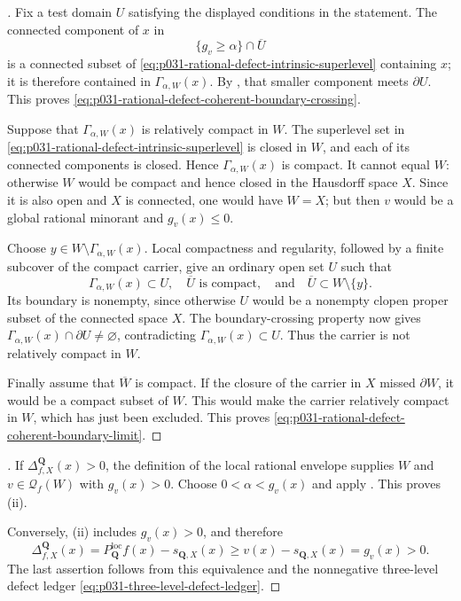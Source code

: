 \begin{proof}[]
Fix a test domain $U$ satisfying the displayed conditions in the statement.
The connected component of $x$ in
\[
       \{g_v\geq\alpha\}\cap\overline U
\]
is a connected subset of
\eqref{eq:p031-rational-defect-intrinsic-superlevel} containing $x$; it is
therefore contained in $\Gamma_{\alpha,W}(x)$.  By
, that smaller component meets
$\partial U$.  This proves
\eqref{eq:p031-rational-defect-coherent-boundary-crossing}.

Suppose that $\Gamma_{\alpha,W}(x)$ is relatively compact in $W$.  The
superlevel set in
\eqref{eq:p031-rational-defect-intrinsic-superlevel} is closed in $W$, and
each of its connected components is closed.  Hence
$\Gamma_{\alpha,W}(x)$ is compact.  It cannot equal $W$: otherwise $W$
would be compact and hence closed in the Hausdorff space $X$.  Since it is
also open and $X$ is connected, one would have $W=X$; but then $v$ would be
a global rational minorant and
$g_v(x)\leq0$.

Choose $y\in W\setminus\Gamma_{\alpha,W}(x)$.  Local compactness and
regularity, followed by a finite subcover of the compact carrier, give an
ordinary open set $U$ such that
\[
 \Gamma_{\alpha,W}(x)\subset U,\quad
 \overline U\text{ is compact},\quad\text{and}\quad
 \overline U\subset W\setminus\{y\}.
\]
Its boundary is nonempty, since otherwise $U$ would be a nonempty clopen
proper subset of the connected space $X$.  The boundary-crossing property
now gives
$\Gamma_{\alpha,W}(x)\cap\partial U\ne\varnothing$, contradicting
$\Gamma_{\alpha,W}(x)\subset U$.  Thus the carrier is not relatively
compact in $W$.

Finally assume that $\overline W$ is compact.  If the closure of the
carrier in $X$ missed $\partial W$, it would be a compact subset of $W$.
This would make the carrier relatively compact in $W$, which has just been
excluded.  This proves
\eqref{eq:p031-rational-defect-coherent-boundary-limit}.
\end{proof}

\begin{proof}[]
If $\Delta^{\mathbf Q}_{f,X}(x)>0$, the definition of the local rational
envelope supplies $W$ and $v\in\mathcal Q_f(W)$ with $g_v(x)>0$.  Choose
$0<\alpha<g_v(x)$ and apply
.  This proves
\textup{(ii)}.

Conversely, \textup{(ii)} includes $g_v(x)>0$, and therefore
\[
 \Delta^{\mathbf Q}_{f,X}(x)
   =P_{\mathbf Q}^{\mathrm{loc}}f(x)-s_{\mathbf Q,X}(x)
   \geq v(x)-s_{\mathbf Q,X}(x)
   =g_v(x)>0.
\]
The last assertion follows from this equivalence and the nonnegative
three-level defect ledger
\eqref{eq:p031-three-level-defect-ledger}.
\end{proof}
